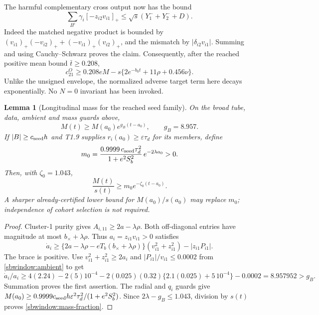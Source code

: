 \documentclass{article} %
\theoremstyle{plain}
\newtheorem{lemma}[theorem]{Lemma}
\theoremstyle{definition}
\theoremstyle{remark}
\begin{document}
The harmful complementary cross output now has the bound
\[
 \sum_{B^c}\gamma_i[-z_{i2}v_{i1}]_+
 \le\sqrt{s}(Y_1^-+Y_2^-+D).
\]
Indeed the matched negative product is bounded by
$(v_{i1})_+(-v_{i2})_++(-v_{i1})_+(v_{i2})_+$,
and the mismatch by $|\delta_{i2}v_{i1}|$. Summing and using
Cauchy--Schwarz proves the claim. Consequently, after the reached
positive mean bound $\bar t\ge0.208$,
\begin{equation}\label{sbwindow:signed-feedback}
 c_{21}^O\ge0.208eM-s\{2e^{-b_0t}+11\rho+0.456\nu\}.
\end{equation}
Unlike the unsigned envelope, the normalized adverse target term here
decays exponentially. No $N=0$ invariant has been invoked.

\begin{lemma}[Longitudinal mass for the reached seed family]
\label{sbwindow:seed-mass}
On the broad tube, data, ambient and mass guards above,
\[
 M(t)\ge M(a_0)e^{g_B(t-a_0)},\qquad g_B=8.957.
\]
If $|B|\ge c_{\rm seed}h$ and T1.9 supplies
$r_i(a_0)\ge\varepsilon\tau_d$ for its members, define
\[
 m_0=\frac{0.9999\,c_{\rm seed}\tau_d^2}
                   {1+e^2S_b^2}\,e^{-2\lambda a_0}>0.
\]
Then, with $\zeta_0=1.043$,
\begin{equation}\label{sbwindow:mass-fraction}
 \frac{M(t)}{s(t)}\ge m_0e^{-\zeta_0(t-a_0)}.
\end{equation}
A sharper already-certified lower bound for $M(a_0)/s(a_0)$ may replace
$m_0$; independence of cohort selection is not required.
\end{lemma}
\begin{proof}
Cluster-1 purity gives $A_{i,11}\ge2a-\lambda\rho$.
Both off-diagonal entries have magnitude at most $b_\times+\lambda\rho$.
Thus $a_i=z_{i1}v_{i1}>0$ satisfies
\[
 \dot a_i\ge
 \{2a-\lambda\rho-eT_b(b_\times+\lambda\rho)\}
                        (v_{i1}^2+z_{i1}^2)-|z_{i1}P_{i1}|.
\]
The brace is positive. Use $v_{i1}^2+z_{i1}^2\ge2a_i$ and
$|P_{i1}|/v_{i1}\le0.0002$ from \eqref{sbwindow:ambient} to get
\[
 \dot a_i/a_i\ge
 4(2.24)-2(5)10^{-4}
 -2(0.025)(0.32)\{2.1(0.025)+5\,10^{-4}\}-0.0002
 =8.957952>g_B.
\]
Summation proves the first assertion. The radial and $q_i$ guards give
$M(a_0)\ge0.9999c_{\rm seed}h\varepsilon^2\tau_d^2/(1+e^2S_b^2)$.
Since $2\lambda-g_B\le1.043$, division by $s(t)$ proves
\eqref{sbwindow:mass-fraction}.
\end{proof}
\end{document}
